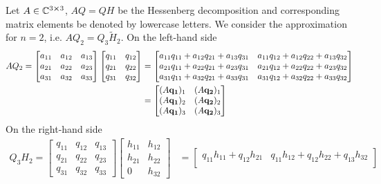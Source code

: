 \begin{example}
	Let \(A\in \mathbb{C}^{3\cross 3}\), \(AQ=QH\) be the Hessenberg decomposition and corresponding matrix elements
	be denoted by lowercase letters. We consider the approximation for \(n = 2\), i.e. \(AQ_2 = Q_3 \tilde{H}_2\).
	On the left-hand side
	\begin{align*}
		AQ_2 =
		\begin{bmatrix}
			a_{11} & a_{12} & a_{13} \\
			a_{21} & a_{22} & a_{23} \\
			a_{31} & a_{32} & a_{33}
		\end{bmatrix}
		\begin{bmatrix}
			q_{11} & q_{12} \\
			q_{21} & q_{22} \\
			q_{31} & q_{32}
		\end{bmatrix}
		 & =
		\begin{bmatrix}
			a_{11}q_{11} + a_{12}q_{21} + a_{13}q_{31} & a_{11}q_{12} + a_{12}q_{22} + a_{13}q_{32} \\
			a_{21}q_{11} + a_{22}q_{21} + a_{23}q_{31} & a_{21}q_{12} + a_{22}q_{22} + a_{23}q_{32} \\
			a_{31}q_{11} + a_{32}q_{21} + a_{33}q_{31} & a_{31}q_{12} + a_{32}q_{22} + a_{33}q_{32}
		\end{bmatrix} \\
		 & =
		\begin{bmatrix}
			(A\vectorbold{q_1})_1 & (A\vectorbold{q_2})_1 \\
			(A\vectorbold{q_1})_2 & (A\vectorbold{q_2})_2 \\
			(A\vectorbold{q_1})_3 & (A\vectorbold{q_2})_3
		\end{bmatrix}
	\end{align*}
	On the right-hand side
	\begin{align*}
		Q_3 H_2 =
		\begin{bmatrix}
			q_{11} & q_{12} & q_{13} \\
			q_{21} & q_{22} & q_{23} \\
			q_{31} & q_{32} & q_{33}
		\end{bmatrix}
		\begin{bmatrix}
			h_{11} & h_{12} \\
			h_{21} & h_{22} \\
			0      & h_{32}
		\end{bmatrix}
		 & =
		\begin{bmatrix}
			q_{11}h_{11} + q_{12}h_{21} & q_{11}h_{12} + q_{12}h_{22} + q_{13}h_{32} \\

\end{bmatrix}
\end{align*}
\end{example}
